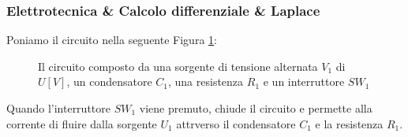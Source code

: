\documentclass[a4paper, 10pt, final]{article} %
\begin{document}
    \subsubsection{Elettrotecnica \& Calcolo differenziale \& Laplace} \label{sec:ElectronicsCalculusLaplace}
    Poniamo il circuito nella seguente Figura \ref{fig:CapTrasferFunctionExampleSchematic}:
    \begin{figure}[H]
        \centering
        \caption{Il circuito composto da una sorgente di tensione alternata $V_1$ di $U[V]$, un condensatore $C_1$, una resistenza $R_1$ e un interruttore $SW_1$}
        \label{fig:CapTrasferFunctionExampleSchematic}
    \end{figure}
    \noindent Quando l'interruttore $SW_1$ viene premuto, chiude il circuito e permette alla corrente di fluire dalla sorgente $U_1$ attrverso il condensatore $C_1$ e la resistenza $R_1$.
\end{document}
